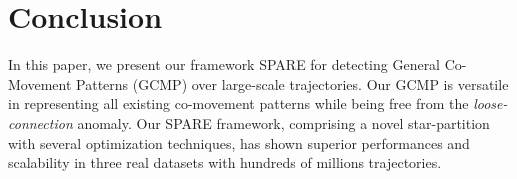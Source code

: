 \section{Conclusion}
\label{sec:concl}
In this paper, we present our framework SPARE for detecting General Co-Movement Patterns (GCMP) over large-scale trajectories. Our GCMP is versatile in representing all existing co-movement patterns while being free from the \emph{loose-connection} anomaly. Our SPARE framework, comprising a novel star-partition with several optimization techniques, has shown superior performances and scalability in three real datasets with hundreds of millions trajectories. 